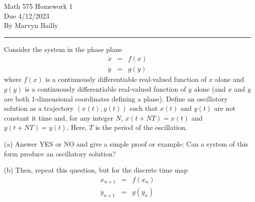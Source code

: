 \documentclass[12pt]{report}
\begin{document}
\large

\begin{center}
 Math 575 Homework 1\\
 Due 4/12/2023\\
 By Marvyn Bailly\\
\end{center}

\normalsize

\hrule



\begin{problem}
    Consider the system in the phase plane
    \begin{eqnarray*} 
        \dot x &=& f(x) \\
        \dot y &=& g(y) 
    \end{eqnarray*} 
    where $f(x)$ is a continuously differentiable real-valued function of $x$ alone and $g(y)$ is a continuously differentiable real-valued function of $y$ alone (and $x$ and $y$ are both 1-dimensional coordinates defining a plane).  Define an oscillatory solution as a trajectory $(x(t), y(t))$ such that $x(t)$ and $y(t)$ are not constant it time and, for any integer $N$, $x(t+N T) = x(t)$ and $y(t+N T) = y(t)$.  Here, $T$ is the period of the oscillation.

    \smallskip
    \noindent
    (a) Answer YES or NO and give a simple proof or example:  Can a system of this form produce an oscillatory solution?  
    
    \smallskip
    \noindent
    (b) Then, repeat this question, but for the discrete time map 
    \begin{eqnarray*} 	x_{n+1} &=& f(x_n) \\
        \dot y_{n+1} &=& g(y_n) 
    \end{eqnarray*}
\end{problem}
\end{document}
